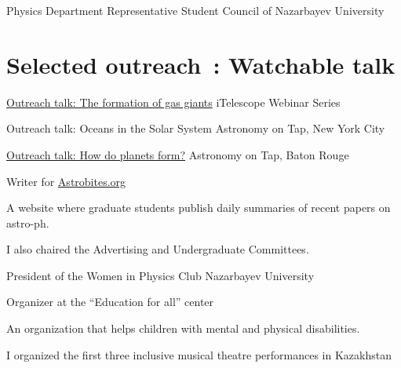 \documentclass[10pt]{article} %
\begin{document}
\begin{paracol}{1}
	
	{Physics Department Representative}
	{Student Council of Nazarbayev University}
	
\section{Selected outreach \footnotesize {\faVideoCamera}\,: Watchable talk \phantom{XX.}}

	{\href{https://www.youtube.com/watch?v=w7dNKDIJ9DM}{Outreach talk: The formation of gas giants} \faVideoCamera}
	{iTelescope Webinar Series}

	{Outreach talk: Oceans in the Solar System}
	{Astronomy on Tap, New York City}
	
	{\href{https://www.youtube.com/watch?v=E-OefNM564E}{Outreach talk: How do planets form?} \faVideoCamera}
	{Astronomy on Tap, Baton Rouge}

	{Writer for \href{https://astrobites.org/author/ssagynbayeva/}{Astrobites.org}}
	{A website where graduate students publish daily summaries of recent papers on astro-ph.
	
	I also chaired the Advertising and Undergraduate Committees.}

	
	
	{President of the Women in Physics Club}
	{Nazarbayev University}
	

	{Organizer at the “Education for all” center}
	{An organization that helps children with mental and physical disabilities. 
	
	I organized the first three inclusive musical theatre performances in Kazakhstan}
	
	




\end{paracol}
\end{document}
